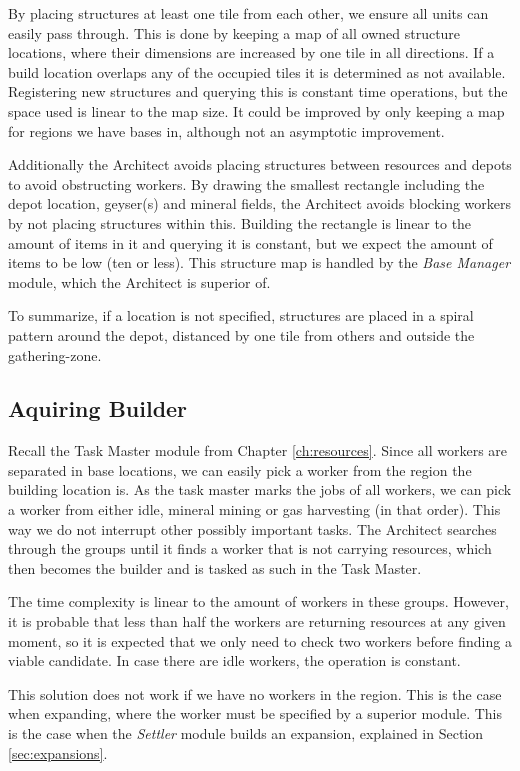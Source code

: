 	By placing structures at least one tile from each other, we ensure all units can easily pass through. This is done by keeping a map of all owned structure locations, where their dimensions are increased by one tile in all directions. If a build location overlaps any of the occupied tiles it is determined as not available. Registering new structures and querying this is constant time operations, but the space used is linear to the map size. It could be improved by only keeping a map for regions we have bases in, although not an asymptotic improvement.
	
	Additionally the Architect avoids placing structures between resources and depots to avoid obstructing workers. By drawing the smallest rectangle including the depot location, geyser(s) and mineral fields, the Architect avoids blocking workers by not placing structures within this. Building the rectangle is linear to the amount of items in it and querying it is constant, but we expect the amount of items to be low (ten or less). This structure map is handled by the \emph{Base Manager} module, which the Architect is superior of.
	
	To summarize, if a location is not specified, structures are placed in a spiral pattern around the depot, distanced by one tile from others and outside the gathering-zone.

	\subsection*{Aquiring Builder}
	Recall the Task Master module from Chapter \ref{ch:resources}. Since all workers are separated in base locations, we can easily pick a worker from the region the building location is. As the task master marks the jobs of all workers, we can pick a worker from either idle, mineral mining or gas harvesting (in that order). This way we do not interrupt other possibly important tasks. The Architect searches through the groups until it finds a worker that is not carrying resources, which then becomes the builder and is tasked as such in the Task Master.
	
	The time complexity is linear to the amount of workers in these groups. However, it is probable that less than half the workers are returning resources at any given moment, so it is expected that we only need to check two workers before finding a viable candidate. In case there are idle workers, the operation is constant.
	
	This solution does not work if we have no workers in the region. This is the case when expanding, where the worker must be specified by a superior module. This is the case when the \emph{Settler} module builds an expansion, explained in Section \ref{sec:expansions}.
	
